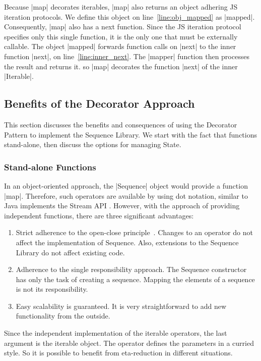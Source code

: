 Because |map| decorates iterables, |map| also returns an object adhering JS
iteration protocols. 
We define this object on line~\ref{line:obj_mapped} as |mapped|. 
Consequently, |map| also has a next function. Since the JS iteration protocol 
specifies only this single function, it is the only one that must be externally 
callable. The object |mapped| forwards function calls on |next| to the
inner function |next|, on line~\ref{line:inner_next}. The |mapper| function then 
processes the result and returns it. so |map| decorates the function |next| of
the inner |Iterable|.

\subsection{Benefits of the Decorator Approach}
\label{sub:Benefits of the Decorator Approach}
This section discusses the benefits and consequences of using the Decorator 
Pattern to implement the Sequence Library. We start with the fact that functions 
stand-alone, then discuss the options for managing State.

\subsubsection{Stand-alone Functions}
\label{subsub:Standalone Functions}
In an object-oriented approach, the |Sequence| object would provide a function
|map|. Therefore, such operators are available by using dot notation,
similar to Java implements the Stream API \cite{java_stream}. 
However, with the approach of providing independent functions, there 
are three significant advantages:

\begin{enumerate}
  \item {Strict adherence to the open-close principle~\cite[p.~3]{eilebrecht_patterns_2019}. Changes to an operator do
      not affect the implementation of Sequence. Also, extensions to the 
      Sequence Library do not affect existing code.
    }
  \item{Adherence to the single responsibility approach. The Sequence 
      constructor has only the task of creating a sequence. Mapping the
    elements of a sequence is not its responsibility.
  }
  \item{Easy scalability is guaranteed. It is very straightforward to add new 
    functionality from the outside.
  }
\end{enumerate}

Since the independent implementation of the iterable operators, the last
argument is the iterable object. The operator defines the 
parameters in a curried style. So it is possible to benefit from eta-reduction 
in different situations.

